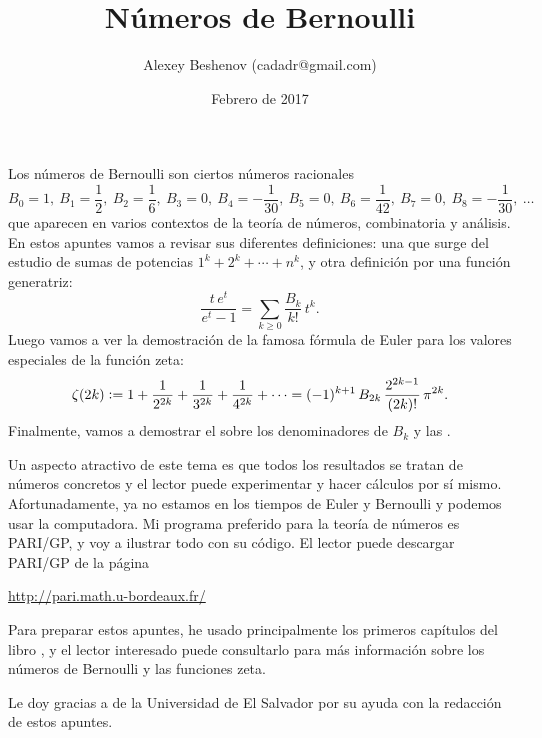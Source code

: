 \documentclass{article}
\author{Alexey Beshenov (cadadr@gmail.com)}
\title{Números de Bernoulli}
\date{Febrero de 2017}
\numberwithin{equation}{section}
\theoremstyle{definition}
\begin{document}
{\normalfont\sffamily\bfseries \maketitle}

Los números de Bernoulli son ciertos números racionales
$$B_0 = 1, ~
B_1 = \frac{1}{2}, ~
B_2 = \frac{1}{6}, ~
B_3 = 0, ~
B_4 = -\frac{1}{30}, ~
B_5 = 0, ~
B_6 = \frac{1}{42}, ~
B_7 = 0, ~
B_8 = -\frac{1}{30}, ~
\ldots$$
que aparecen en varios contextos de la teoría de números, combinatoria y
análisis. En estos apuntes vamos a revisar sus diferentes definiciones:
una que surge del estudio de sumas de potencias $1^k + 2^k + \cdots + n^k$,
y otra definición por una función generatriz:
$$\frac{t\,e^t}{e^t - 1} = \sum_{k\ge 0} \frac{B_k}{k!}\,t^k.$$
Luego vamos a ver la demostración de la famosa fórmula de Euler para los valores
especiales de la función zeta:
$$\zeta (2k) \mathrel{\mathop:}= 1 + \frac{1}{2^{2k}} + \frac{1}{3^{2k}} + \frac{1}{4^{2k}} + \cdots =
(-1)^{k+1} \, B_{2k}\,\frac{2^{2k-1}}{(2k)!}\,\pi^{2k}.$$
Finalmente, vamos a demostrar el  sobre los
denominadores de $B_k$ y las .

\vspace{1em}

Un aspecto atractivo de este tema es que todos los resultados se tratan de
números concretos y el lector puede experimentar y hacer cálculos por sí
mismo. Afortunadamente, ya no estamos en los tiempos de Euler y Bernoulli y
podemos usar la computadora. Mi programa preferido para la teoría de números es
PARI/GP, y voy a ilustrar todo con su código. El lector puede descargar PARI/GP
de la página

\begin{center}
  \noindent\url{http://pari.math.u-bordeaux.fr/}
\end{center}

\vspace{1em}

Para preparar estos apuntes, he usado principalmente los primeros capítulos
del libro \cite{Arakawa-Ibukiyama-Kaneko-2014}, y el lector interesado puede
consultarlo para más información sobre los números de Bernoulli y las funciones
zeta.

\vspace{1em}

Le doy gracias a  de la Universidad de
El Salvador por su ayuda con la redacción de estos apuntes.
\end{document}
